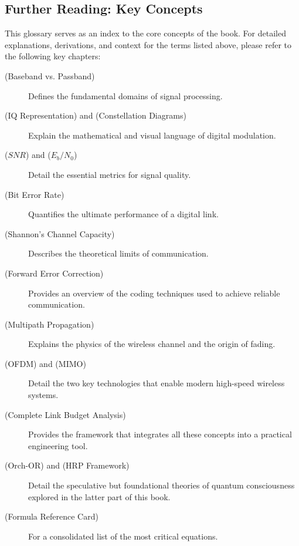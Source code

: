 \begin{importantbox}
\section*{Further Reading: Key Concepts}
This glossary serves as an index to the core concepts of the book. For detailed explanations, derivations, and context for the terms listed above, please refer to the following key chapters:
\begin{description}
    \item[ (Baseband vs. Passband)] Defines the fundamental domains of signal processing.
    \item[ (IQ Representation) and  (Constellation Diagrams)] Explain the mathematical and visual language of digital modulation.
    \item[ (\(SNR\)) and  (\(E_b/N_0\))] Detail the essential metrics for signal quality.
    \item[ (Bit Error Rate)] Quantifies the ultimate performance of a digital link.
    \item[ (Shannon's Channel Capacity)] Describes the theoretical limits of communication.
    \item[ (Forward Error Correction)] Provides an overview of the coding techniques used to achieve reliable communication.
    \item[ (Multipath Propagation)] Explains the physics of the wireless channel and the origin of fading.
    \item[ (OFDM) and  (MIMO)] Detail the two key technologies that enable modern high-speed wireless systems.
    \item[ (Complete Link Budget Analysis)] Provides the framework that integrates all these concepts into a practical engineering tool.
    \item[ (Orch-OR) and  (HRP Framework)] Detail the speculative but foundational theories of quantum consciousness explored in the latter part of this book.
    \item[ (Formula Reference Card)] For a consolidated list of the most critical equations.
\end{description}
\end{importantbox}